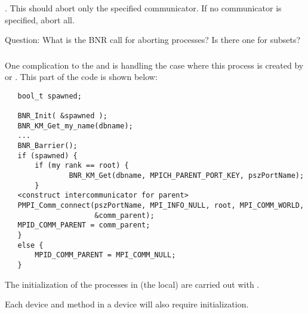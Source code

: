 \documentclass{article}
\begin{document}
\subsubsection{}
.  This should abort only the specified communicator.  If
no communicator is specified, abort all.  

Question: What is the BNR call for aborting processes?  Is there one for
subsets?  

\subsubsection{}

One complication to the  and  is
handling the case where this process is created by  or
.  This part of the code is shown below:
\begin{verbatim}
   bool_t spawned;

   BNR_Init( &spawned );
   BNR_KM_Get_my_name(dbname);
   ...
   BNR_Barrier();
   if (spawned) {
       if (my rank == root) {
               BNR_KM_Get(dbname, MPICH_PARENT_PORT_KEY, pszPortName);
       }
   <construct intercommunicator for parent>
   PMPI_Comm_connect(pszPortName, MPI_INFO_NULL, root, MPI_COMM_WORLD, 
                     &comm_parent);
   MPID_COMM_PARENT = comm_parent;
   }
   else {
       MPID_COMM_PARENT = MPI_COMM_NULL;
   }
\end{verbatim}

The initialization of the processes in (the local) 
are carried out with .

Each device and method in a device will also require initialization.  
\end{document}
